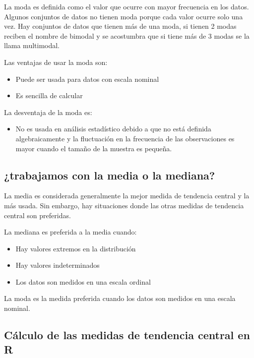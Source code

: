 \documentclass[]{book}
\providecommand{\tightlist}{%
  \setlength{\itemsep}{0pt}\setlength{\parskip}{0pt}}
\begin{document}
La moda es definida como el valor que ocurre con mayor frecuencia en los
datos. Algunos conjuntos de datos no tienen moda porque cada valor
ocurre solo una vez. Hay conjuntos de datos que tienen más de una moda,
si tienen 2 modas reciben el nombre de bimodal y se acostumbra que si
tiene más de 3 modas se la llama multimodal.

Las ventajas de usar la moda son:

\begin{itemize}
\tightlist
\item
  Puede ser usada para datos con escala nominal
\item
  Es sencilla de calcular
\end{itemize}

La desventaja de la moda es:

\begin{itemize}
\tightlist
\item
  No es usada en análisis estadístico debido a que no está definida
  algebraicamente y la fluctuación en la frecuencia de las observaciones
  es mayor cuando el tamaño de la muestra es pequeña.
\end{itemize}

\subsection{¿trabajamos con la media o la
mediana?}\label{trabajamos-con-la-media-o-la-mediana}

La media es considerada generalmente la mejor medida de tendencia
central y la más usada. Sin embargo, hay situaciones donde las otras
medidas de tendencia central son preferidas.

La mediana es preferida a la media cuando:

\begin{itemize}
\tightlist
\item
  Hay valores extremos en la distribución
\item
  Hay valores indeterminados
\item
  Los datos son medidos en una escala ordinal
\end{itemize}

La moda es la medida preferida cuando los datos son medidos en una
escala nominal.

\subsection{Cálculo de las medidas de tendencia central en
R}\label{calculo-de-las-medidas-de-tendencia-central-en-r}
\end{document}
